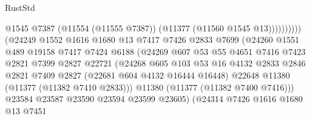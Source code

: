 \begin{lexlean}{RustStd}
\begin{coremodule}
                                              @1545
                                              @7387
                                              (@11554 (@11555 @7387))
                                              (@11377 (@11560 @1545 @13))))))))))
                              (@24249
                                @1552
                                @1616
                                @1680
                                @13
                                @7417
                                @7426
                                @2833
                                @7699
                                (@24260
                                  @1551
                                  @489
                                  @19158
                                  @7417
                                  @7424
                                  @6188
                                  (@24269
                                    @607
                                    @53
                                    @55
                                    @4651
                                    @7416
                                    @7423
                                    @2821
                                    @7399
                                    @2827
                                    @22721
                                    (@24268
                                      @605
                                      @103
                                      @53
                                      @16
                                      @4132
                                      @2833
                                      @2846
                                      @2821
                                      @7409
                                      @2827
                                      (@22681 @604 @4132 @16444 @16448)
                                      @22648
                                      @11380
                                      (@11377 (@11382 @7410 @2833)))
                                    @11380
                                    (@11377 (@11382 @7400 @7416)))
                                  @23584
                                  @23587
                                  @23590
                                  @23594
                                  @23599
                                  @23605)
                                (@24314
                                  @7426
                                  @1616
                                  @1680
                                  @13
                                  @7451

\end{coremodule}
\end{lexlean}

